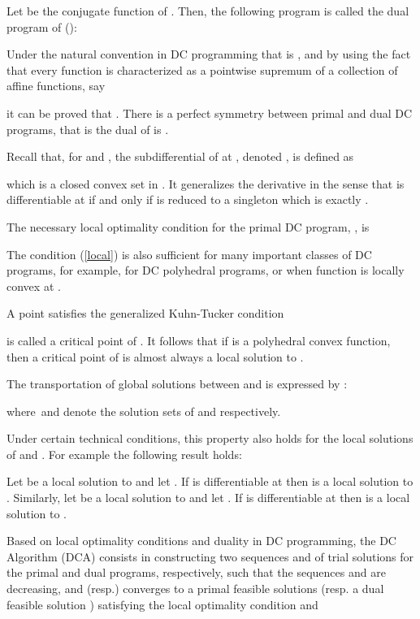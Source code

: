 \documentclass{iesmart}
\begin{document}
Let  be the conjugate function of . Then, the
following program is called the dual program of ():

Under the natural convention in DC programming that is ,
and by using the fact that every function   is characterized as a
pointwise supremum of a collection of affine functions, say

it can be proved that  \cite{PLT98}. There is a
perfect symmetry between primal and dual DC programs, that is the
dual of  is .

Recall that, for  and  ,  the subdifferential of  at ,
denoted ,  is  defined as

which is a closed convex set in . It
generalizes the derivative in the sense that  is
differentiable at  if and only if 
is reduced to a singleton which is exactly .

The necessary local optimality condition for the primal DC
program, , is

The condition (\ref{local}) is also sufficient for many important
classes of DC programs, for example, for DC polyhedral programs,
or when function  is locally convex at 
\cite{lethi2005,PLT97}.

A point  satisfies the generalized Kuhn-Tucker condition

 is called a critical point of
. It follows that if  is a polyhedral convex function,
then a critical point
 of  is almost always a local solution to .

The transportation of global solutions between  and
 is expressed by
\cite{lethithesis,lethi2005,PLT97,PLT98}:


where\  and  denote the solution sets of
 and  respectively.

Under certain technical conditions, this property also holds  for
the local solutions of  and 
\cite{lethithesis,lethi2005,PLT97,PLT98}. For example the
following result holds:

 Let  be a local solution to
 and let . If  is
differentiable at  then  is a local solution to
. Similarly, let  be a local solution to 
and let . If  is differentiable at
 then  is a local solution to .

Based on local optimality conditions and duality in DC
programming, the DC Algorithm (DCA) consists in   constructing two
sequences  and   of trial solutions for the
primal and dual programs, respectively, such that the sequences
 and  are decreasing, and
  (resp.) converges  to a primal  feasible solutions 
(resp. a dual feasible solution )
  satisfying   the local optimality condition  and
\end{document}
